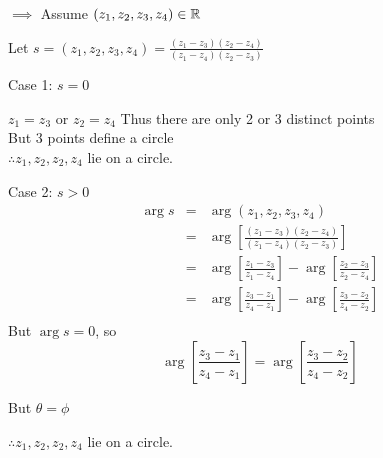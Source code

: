 \documentclass[letterpaper,12pt,fleqn]{article}
\renewcommand{\o}{\theta}
\newcommand{\p}{\phi}
\begin{document}
\begin{theproof}
  \listbreak
  \begin{description}
  \item $\implies$ Assume $(z_1,z_2,z_3,z_4)\in\mathbb{R}$

    Let $s=(z_1,z_2,z_3,z_4)=\frac{(z_1-z_3)(z_2-z_4)}{(z_1-z_4)(z_2-z_3)}$

    \begin{description}
    \item Case 1: $s=0$

      $z_1=z_3$ or $z_2=z_4$
      Thus there are only 2 or 3 distinct points \\
      But 3 points define a circle \\
      $\therefore z_1,z_2,z_2,z_4$ lie on a circle.

    \item Case 2: $s>0$
      \begin{eqnarray*}
        \arg{s} &=& \arg(z_1,z_2,z_3,z_4) \\
        &=& \arg\left[\frac{(z_1-z_3)(z_2-z_4)}{(z_1-z_4)(z_2-z_3)}\right] \\
        &=& \arg\left[\frac{z_1-z_3}{z_1-z_4}\right]-
        \arg\left[\frac{z_2-z_3}{z_2-z_4}\right] \\
        &=& \arg\left[\frac{z_3-z_1}{z_4-z_1}\right]-
        \arg\left[\frac{z_3-z_2}{z_4-z_2}\right] \\
      \end{eqnarray*}
      But $\arg{s}=0$, so
      \[\arg\left[\frac{z_3-z_1}{z_4-z_1}\right]=
      \arg\left[\frac{z_3-z_2}{z_4-z_2}\right]\]


      But $\o=\p$

      $\therefore z_1,z_2,z_2,z_4$ lie on a circle.
      

\end{description}
\end{description}
\end{theproof}
\end{document}
